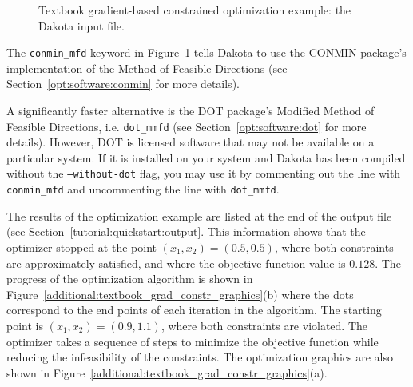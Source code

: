 \begin{figure}[ht!]
  \centering
  \begin{bigbox}
    \begin{small}
    \end{small}
  \end{bigbox}
  \caption{Textbook gradient-based constrained optimization example:
    the Dakota input file.}
  \label{additional:textbook_grad_constr}
\end{figure}

The \texttt{conmin\_mfd} keyword in Figure~\ref{additional:textbook_grad_constr} 
tells Dakota to use the CONMIN package's implementation of the
Method of Feasible Directions (see Section~\ref{opt:software:conmin} 
for more details). 

A significantly faster alternative is the DOT package's 
Modified Method of Feasible Directions, i.e. \texttt{dot\_mmfd} (see 
Section~\ref{opt:software:dot} for more details). However, DOT is 
licensed software that may not be available on a particular system. If it 
is installed on your system and Dakota has been compiled without the 
\texttt{--without-dot} flag, you may use it by commenting out the line with
\texttt{conmin\_mfd} and uncommenting the line with \texttt{dot\_mmfd}.

The results of the optimization example are listed at the end of
the output file (see Section~\ref{tutorial:quickstart:output}.
This information shows that the
optimizer stopped at the point $(x_1,x_2) = (0.5,0.5)$, where both
constraints are approximately satisfied, and where the objective function value is
$0.128$. The progress of the optimization algorithm is shown in
Figure~\ref{additional:textbook_grad_constr_graphics}(b) where the
dots correspond to the end points of each iteration in the algorithm. The
starting point is $(x_1,x_2) = (0.9,1.1)$, where both constraints
are violated. The optimizer takes a
sequence of steps to minimize the objective function while reducing
the infeasibility of the constraints.
The optimization graphics are also shown in
Figure~\ref{additional:textbook_grad_constr_graphics}(a).

